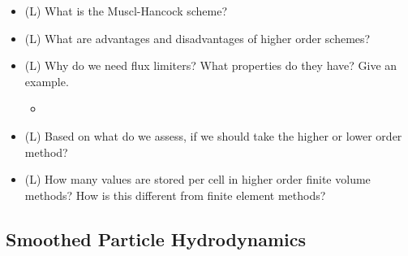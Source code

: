 \begin{itemize}
    \begin{itemize}
        \item {}
    \end{itemize}
    \answerboxM
    \item (L) What is the Muscl-Hancock scheme?
    \answerboxM
    \item (L) What are advantages and disadvantages of higher order schemes?
    \answerboxM
    \item (L) Why do we need flux limiters? What properties do they have? Give an example.
    \begin{itemize}
        \item {}
    \end{itemize}
    \answerboxM
    \item (L) Based on what do we assess, if we should take the higher or lower order method?
    \answerboxM
    \item (L) How many values are stored per cell in higher order finite volume methods? How is this
    different from finite element methods?
    \answerboxS
\end{itemize}

\subsection*{Smoothed Particle Hydrodynamics}

